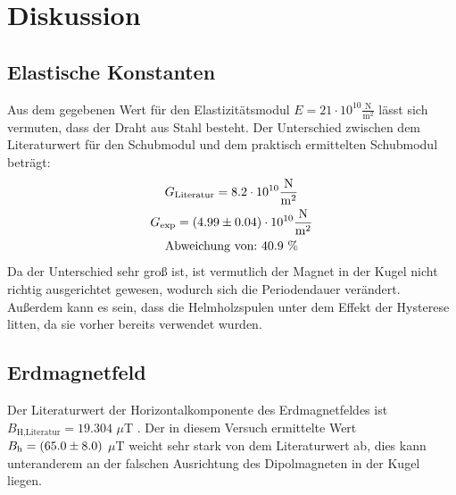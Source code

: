 \section{Diskussion}
\label{sec:Diskussion}
\subsection{Elastische Konstanten}
Aus dem gegebenen Wert für den Elastizitätsmodul $E = 21 \cdot 10^{10} \frac{\text{N}}{\text{m}^2}$ lässt sich vermuten, dass der Draht aus Stahl besteht. Der Unterschied zwischen dem Literaturwert für den Schubmodul und dem praktisch ermittelten Schubmodul beträgt:
\begin{gather*}
  G_\text{Literatur} = 8.2 \cdot 10^{10} \frac{\text{N}}{\text{m}^2} \\
  G_\text{exp} = (\num{4.99 +- 0.04}) \cdot 10^{10} \frac{\text{N}}{\text{m}^2} \\
  \text{Abweichung von:} \ 40.9 \ \%
\end{gather*}
Da der Unterschied sehr groß ist, ist vermutlich der Magnet in der Kugel nicht richtig ausgerichtet gewesen, wodurch sich die Periodendauer verändert. Außerdem kann es sein, dass die Helmholzspulen unter dem Effekt der Hysterese litten, da sie vorher bereits verwendet wurden.

\subsection{Erdmagnetfeld}
Der Literaturwert der Horizontalkomponente des Erdmagnetfeldes ist \\ $B_\text{H,Literatur} = 19.304$ $\mu$T \cite{Literatur}. Der in diesem Versuch ermittelte Wert \\ $B_\text{h} = (\num{65.0 +- 8.0})$ $\mu$T weicht sehr stark von dem Literaturwert ab, dies kann unteranderem an der falschen Ausrichtung des Dipolmagneten in der Kugel liegen.  
